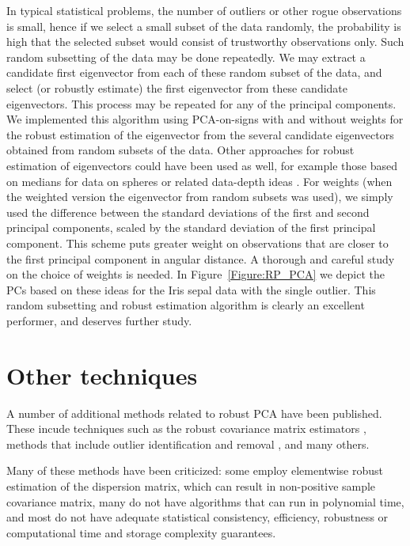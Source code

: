 \documentclass[ss]{imsart}
\theoremstyle{Example}
\begin{document}
In typical statistical problems, the number of outliers or other rogue observations is small, hence if we select a small subset of the data randomly, the probability is high that the selected subset would consist of trustworthy observations only. Such random subsetting of the data may be done repeatedly. We may extract a candidate first eigenvector from each of these random subset of the data, and select (or robustly estimate) the first eigenvector from these candidate eigenvectors. This process may be repeated for any of the principal components. We implemented this algorithm using
PCA-on-signs with and without weights for the robust estimation of the eigenvector from the several candidate eigenvectors obtained from random subsets of the data. Other approaches for robust estimation of eigenvectors could have been used as well, for example those based on medians for data on spheres or related data-depth ideas \cite{ref:EJS14795_MultQuant, ref:AoS921468_LiuSingh_Depth_Spherical}. For weights (when the weighted version the eigenvector from random subsets was used), we simply used the difference between the standard deviations of the first and second principal components, scaled by the standard deviation of the first principal component. This scheme puts greater weight on observations that are closer to the first principal component in angular distance. A thorough and careful study on the choice of weights is needed.
In Figure~\ref{Figure:RP_PCA} we depict the PCs based on these ideas for the Iris sepal data with the single outlier.  This random subsetting and robust estimation algorithm is clearly an excellent performer, and deserves further study.

\section{Other techniques}
\label{Sec:Misc_PCA}
A number of additional methods related to robust PCA have been published. These incude techniques such as the robust covariance matrix estimators
\cite{ref:Biometrics7281_Gnanadesikanetal_RPCA, ref:JASA81354_Devlinetal_RPCA, 
ref:Biometrika00603_CrouxHaesbroeck_RPCA, ref:Bioinformatics071164_PCA}, methods that include outlier identification and removal \cite{dunagan2004optimal, brubaker2009robust}, and many others. 

Many of these methods have been criticized: some employ  elementwise robust estimation of the dispersion matrix, which can result in non-positive sample covariance matrix, many do not have algorithms that can run in polynomial time, and most do not have adequate statistical consistency, efficiency, robustness or computational time and storage complexity guarantees.
\end{document}
